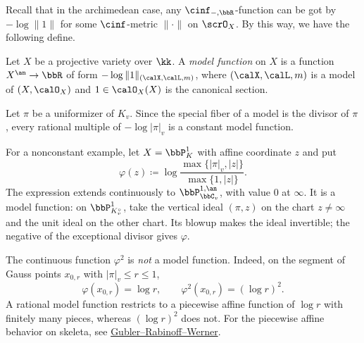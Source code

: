 Recall that in the archimedean case, any $\cinf_{-,\bbR}$-function can be got by $-\log \|1\|$ for some $\cinf$-metric $\|\cdot\|$ on $\scrO_X$.
By this way, we have the following define.

\begin{definition}[label=\labelNFM{def:model-function-over-na-place}, status=draft, tag=0000000]
	Let $X$ be a projective variety over $\kk$.
	A \emph{model function} on $X$ is a function $X^\an \to \bbR$ of form $- \log \|1\|_{(\calX,\calL,m)}$, where $(\calX,\calL,m)$ is a model of $(X,\calO_X)$ and $1 \in \calO_X(X)$ is the canonical section.
\end{definition}

\begin{example}[label=\labelNFM{eg:model-function}, status=draft, tag=0000000]
	\begin{latexmathchange}
		Let $\pi$ be a uniformizer of $K_v$.
		Since the special fiber of a model is the divisor of $\pi$, every rational multiple of $-\log|\pi|_v$ is a constant model function.

		For a nonconstant example, let $X = \bbP^1_K$ with affine coordinate $z$ and put
		\[ \varphi(z) \coloneqq \log\frac{\max\{|\pi|_v,|z|\}}{\max\{1,|z|\}}. \]
		The expression extends continuously to $\bbP^{1,\an}_{\bbC_v}$, with value $0$ at $\infty$.
		It is a model function: on $\bbP^1_{K_v^\circ}$, take the vertical ideal $(\pi,z)$ on the chart $z \neq \infty$ and the unit ideal on the other chart.
		Its blowup makes the ideal invertible; the negative of the exceptional divisor gives $\varphi$.

		The continuous function $\varphi^2$ is \emph{not} a model function.
		Indeed, on the segment of Gauss points $x_{0,r}$ with $|\pi|_v \leq r \leq 1$,
		\[ \varphi(x_{0,r}) = \log r, \qquad \varphi^2(x_{0,r}) = (\log r)^2. \]
		A rational model function restricts to a piecewise affine function of $\log r$ with finitely many pieces,
		whereas $(\log r)^2$ does not.
		For the piecewise affine behavior on skeleta, see \href{https://gubler.app.uni-regensburg.de/Publikationen/1404.7044v1.pdf}{Gubler--Rabinoff--Werner}.
	\end{latexmathchange}
\end{example}


